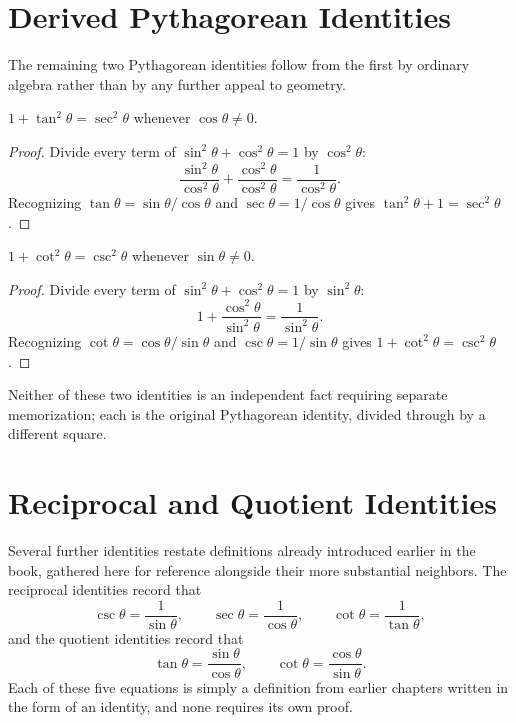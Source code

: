 \section{Derived Pythagorean Identities}

The remaining two Pythagorean identities follow from the first by ordinary
algebra rather than by any further appeal to geometry.

\begin{theorem}
$1 + \tan^2\theta = \sec^2\theta$ whenever $\cos\theta \neq 0$.
\end{theorem}

\begin{proof}
Divide every term of $\sin^2\theta + \cos^2\theta = 1$ by $\cos^2\theta$:
\[
\frac{\sin^2\theta}{\cos^2\theta} + \frac{\cos^2\theta}{\cos^2\theta} =
\frac{1}{\cos^2\theta}.
\]
Recognizing $\tan\theta = \sin\theta/\cos\theta$ and $\sec\theta =
1/\cos\theta$ gives $\tan^2\theta + 1 = \sec^2\theta$.
\end{proof}

\begin{theorem}
$1 + \cot^2\theta = \csc^2\theta$ whenever $\sin\theta \neq 0$.
\end{theorem}

\begin{proof}
Divide every term of $\sin^2\theta + \cos^2\theta = 1$ by $\sin^2\theta$:
\[
1 + \frac{\cos^2\theta}{\sin^2\theta} = \frac{1}{\sin^2\theta}.
\]
Recognizing $\cot\theta = \cos\theta/\sin\theta$ and $\csc\theta =
1/\sin\theta$ gives $1 + \cot^2\theta = \csc^2\theta$.
\end{proof}

Neither of these two identities is an independent fact requiring separate
memorization; each is the original Pythagorean identity, divided through by
a different square.

\section{Reciprocal and Quotient Identities}

Several further identities restate definitions already introduced earlier
in the book, gathered here for reference alongside their more substantial
neighbors. The reciprocal identities record that
\[
\csc\theta = \frac{1}{\sin\theta}, \qquad
\sec\theta = \frac{1}{\cos\theta}, \qquad
\cot\theta = \frac{1}{\tan\theta},
\]
and the quotient identities record that
\[
\tan\theta = \frac{\sin\theta}{\cos\theta}, \qquad
\cot\theta = \frac{\cos\theta}{\sin\theta}.
\]
Each of these five equations is simply a definition from earlier chapters
written in the form of an identity, and none requires its own proof.

